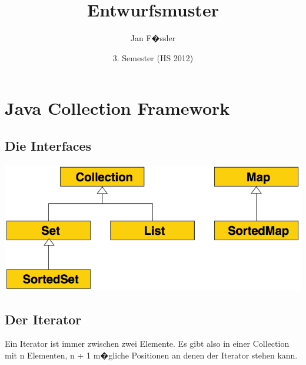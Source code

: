 \documentclass[a4paper, 11pt]{article}
\title{Entwurfsmuster}
\author{Jan F�ssler}
\date{3. Semester (HS 2012)}
\begin{document}
\maketitle
\thispagestyle{fancy}

\newpage

\tableofcontents	  	


\newpage
\setcounter{page}{1}


\section{Java Collection Framework}
\subsection{Die Interfaces}
\begin{center}
\includegraphics[scale=0.3]{jcf-interfaces.png}
\end{center}

\subsection{Der Iterator}
Ein Iterator ist immer zwischen zwei Elemente. Es gibt also in einer Collection mit n Elementen, n + 1 m�gliche Positionen an denen der Iterator stehen kann.

\end{document}

